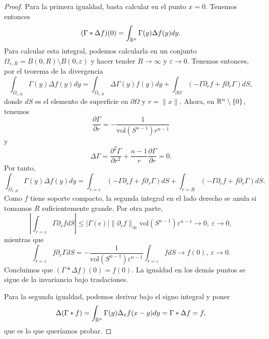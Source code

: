 \documentclass[11pt,a4paper]{amsbook}
\theoremstyle{remark} \newtheorem{rmk}[subsection]{Observación}
\theoremstyle{definition} \newtheorem{defn}[subsection]{Definición}
\theoremstyle{definition} \newtheorem{ex}[subsection]{Ejemplo}
\theoremstyle{definition} \newtheorem{ej}[subsection]{Ejercicio}
\begin{document}
\begin{proof}
  Para la primera igualdad, basta calcular en el punto $x=0$. Tenemos entonces
  \begin{equation*}
(\Gamma * \Delta f) (0) = \int_{\mathbb R^n} \Gamma(y) \Delta f (y) dy.
  \end{equation*}
  Para calcular esta integral, podemos calcularla en un conjunto $\Omega_{\varepsilon,R}=B(0,R)\setminus B(0,\varepsilon)$ y hacer tender $R \rightarrow \infty$ y $\varepsilon \rightarrow 0$. Tenemos entonces, por el teorema de la divergencia
  \begin{equation*}
\int_{\Omega_{\varepsilon,R}} \Gamma(y)\Delta f(y) dy = \int_{\Omega_{\varepsilon,R}} \Delta \Gamma(y) f(y) dy + \int_{\partial \Omega} (-\Gamma \partial_rf + f \partial_r \Gamma) dS,
  \end{equation*}
  donde $dS$ es el elemento de superficie en $\partial \Omega$ y $r=\lVert x \rVert$.
  Ahora, en $\mathbb R^n\setminus \left\{ 0 \right\}$, tenemos
  \begin{equation*}
\frac{\partial \Gamma}{\partial r} = - \frac{1}{\mathrm{vol}(S^{n-1}) r^{n-1}}
  \end{equation*}
  y
  \begin{equation*}
\Delta \Gamma = \frac{\partial^2 \Gamma}{\partial r^2} + \frac{n-1}{r} \frac{\partial \Gamma}{\partial r} = 0.
  \end{equation*}
  Por tanto,
  \begin{equation*}
\int_{\Omega_{\varepsilon,R}} \Gamma(y)\Delta f(y) dy = \int_{r=\varepsilon} (-\Gamma \partial_rf + f \partial_r \Gamma) dS + \int_{r=R} (-\Gamma \partial_rf + f \partial_r \Gamma) dS.
  \end{equation*}
  Como $f$ tiene soporte compacto, la segunda integral en el lado derecho se anula si tomamos $R$ suficientemente grande. Por otra parte,
  \begin{equation*}
\left \lvert \int_{r=\varepsilon}\Gamma \partial_rf dS \right\rvert \leq \lvert \Gamma(\epsilon) \rvert \lVert \partial_r f \rVert_{\infty} \mathrm{vol}(S^{n-1}) \varepsilon^{n-1} \rightarrow 0,\ \varepsilon \rightarrow 0,
  \end{equation*}
  mientras que
  \begin{equation*}
\int_{r=\varepsilon} f \partial_r \Gamma dS = - \frac{1}{\mathrm{vol}(S^{n-1}) \varepsilon^{n-1}} \int_{r=\varepsilon} f dS \rightarrow f(0),\ \varepsilon\rightarrow 0.
  \end{equation*}
  Concluimos que $(\Gamma * \Delta f) (0)=f(0)$. La igualdad en los demás puntos se sigue de la invariancia bajo traslaciones.

  Para la segunda igualdad, podemos derivar bajo el signo integral y poner
  \begin{equation*}
\Delta (\Gamma * f) = \int_{\mathbb R^n} \Gamma(y) \Delta_xf(x-y) dy = \Gamma * \Delta f = f,
  \end{equation*}
que es lo que queríamos probar.
\end{proof}
\end{document}
